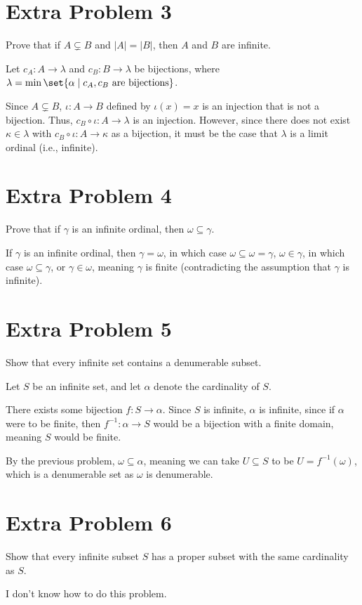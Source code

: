 \documentclass[10pt]{mypackage}
\begin{document}
\section{Extra Problem 3}%
\begin{problem}
  Prove that if $A\subsetneq B$ and $\left\vert A \right\vert = \left\vert B \right\vert$, then $A$ and $B$ are infinite.
\end{problem}
\begin{solution}
  Let $c_A: A\rightarrow \lambda$ and $c_B: B\rightarrow \lambda$ be bijections, where $\lambda = \min\set{\alpha\mid c_A,c_B\text{ are bijections}}$.\newline

  Since $A\subsetneq B$, $\iota: A\rightarrow B$ defined by $\iota(x) = x$ is an injection that is not a bijection. Thus, $c_B\circ\iota: A\rightarrow \lambda$ is an injection. However, since there does not exist $\kappa \in \lambda$ with $c_B\circ \iota: A\rightarrow \kappa$ as a bijection, it must be the case that $\lambda$ is a limit ordinal (i.e., infinite).
\end{solution}
\section{Extra Problem 4}%
\begin{problem}
  Prove that if $\gamma$ is an infinite ordinal, then $\omega \subseteq \gamma$.
\end{problem}
\begin{solution}
  If $\gamma$ is an infinite ordinal, then $\gamma = \omega$, in which case $\omega \subseteq \omega = \gamma$, $\omega \in \gamma$, in which case $\omega \subseteq \gamma$, or $\gamma \in \omega$, meaning $\gamma$ is finite (contradicting the assumption that $\gamma$ is infinite).
\end{solution}
\section{Extra Problem 5}%
\begin{problem}
  Show that every infinite set contains a denumerable subset.
\end{problem}
\begin{solution}
  Let $S$ be an infinite set, and let $\alpha$ denote the cardinality of $S$.\newline

  There exists some bijection $f: S\rightarrow \alpha$. Since $S$ is infinite, $\alpha$ is infinite, since if $\alpha$ were to be finite, then $f^{-1}:\alpha \rightarrow S$ would be a bijection with a finite domain, meaning $S$ would be finite.\newline

  By the previous problem, $\omega \subseteq \alpha$, meaning we can take $U\subseteq S$ to be $U = f^{-1}\left(\omega\right)$, which is a denumerable set as $\omega$ is denumerable.
\end{solution}
\section{Extra Problem 6}%
\begin{problem}
  Show that every infinite subset $S$ has a proper subset with the same cardinality as $S$.
\end{problem}
\begin{solution}
  I don't know how to do this problem.
\end{solution}
\end{document}
